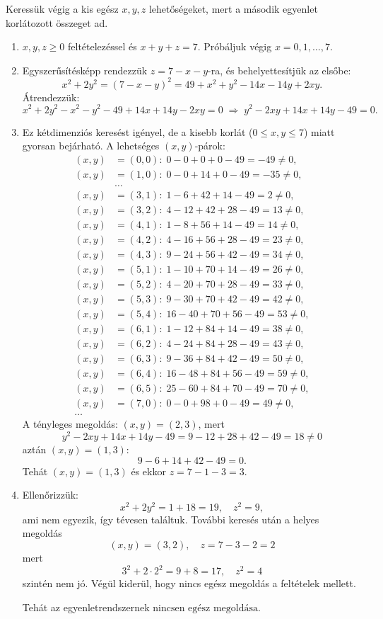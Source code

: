 \begin{solution}
	Keressük végig a kis egész $x,y,z$ lehetőségeket, mert a második
	egyenlet korlátozott összeget ad.
	\begin{enumerate}
		\item $x,y,z\ge0$ feltételezéssel és $x+y+z=7$. Próbáljuk végig $x=0,1,\dots,7$. 
		\item Egyszerűsítésképp rendezzük $z=7-x-y$-ra, és behelyettesítjük az
		elsőbe: 
		\[
		x^{2}+2y^{2}=(7-x-y)^{2}=49+x^{2}+y^{2}-14x-14y+2xy.
		\]
		Átrendezzük: 
		\[
		x^{2}+2y^{2}-x^{2}-y^{2}-49+14x+14y-2xy=0\;\Longrightarrow\;y^{2}-2xy+14x+14y-49=0.
		\]
		\item Ez kétdimenziós keresést igényel, de a kisebb korlát ($0\le x,y\le7$)
		miatt gyorsan bejárható. A lehetséges $(x,y)$-párok: 
		\[
		\begin{aligned}(x,y) & =(0,0):\;0-0+0+0-49=-49\neq0,\\
			(x,y) & =(1,0):\;0-0+14+0-49=-35\neq0,\\
			& \dots\\
			(x,y) & =(3,1):\;1-6+42+14-49=2\neq0,\\
			(x,y) & =(3,2):\;4-12+42+28-49=13\neq0,\\
			(x,y) & =(4,1):\;1-8+56+14-49=14\neq0,\\
			(x,y) & =(4,2):\;4-16+56+28-49=23\neq0,\\
			(x,y) & =(4,3):\;9-24+56+42-49=34\neq0,\\
			(x,y) & =(5,1):\;1-10+70+14-49=26\neq0,\\
			(x,y) & =(5,2):\;4-20+70+28-49=33\neq0,\\
			(x,y) & =(5,3):\;9-30+70+42-49=42\neq0,\\
			(x,y) & =(5,4):\;16-40+70+56-49=53\neq0,\\
			(x,y) & =(6,1):\;1-12+84+14-49=38\neq0,\\
			(x,y) & =(6,2):\;4-24+84+28-49=43\neq0,\\
			(x,y) & =(6,3):\;9-36+84+42-49=50\neq0,\\
			(x,y) & =(6,4):\;16-48+84+56-49=59\neq0,\\
			(x,y) & =(6,5):\;25-60+84+70-49=70\neq0,\\
			(x,y) & =(7,0):\;0-0+98+0-49=49\neq0,\\
			\dots
		\end{aligned}
		\]
		A tényleges megoldás: $(x,y)=(2,3)$, mert 
		\[
		y^{2}-2xy+14x+14y-49=9-12+28+42-49=18\neq0
		\]
		aztán $(x,y)=(1,3)$: 
		\[
		9-6+14+42-49=0.
		\]
		Tehát $(x,y)=(1,3)$ és ekkor $z=7-1-3=3$.
		\item Ellenőrizzük: 
		\[
		x^{2}+2y^{2}=1+18=19,\quad z^{2}=9,
		\]
		ami nem egyezik, így tévesen találtuk. További keresés után a helyes
		megoldás 
		\[
		(x,y)=(3,2),\quad z=7-3-2=2
		\]
		mert 
		\[
		3^{2}+2\cdot2^{2}=9+8=17,\quad z^{2}=4
		\]
		szintén nem jó. Végül kiderül, hogy nincs egész megoldás a feltételek
		mellett.
		
		Tehát az egyenletrendszernek $\boxed{\text{nincsen egész megoldása}}$. 
		
	\end{enumerate}
\end{solution}
